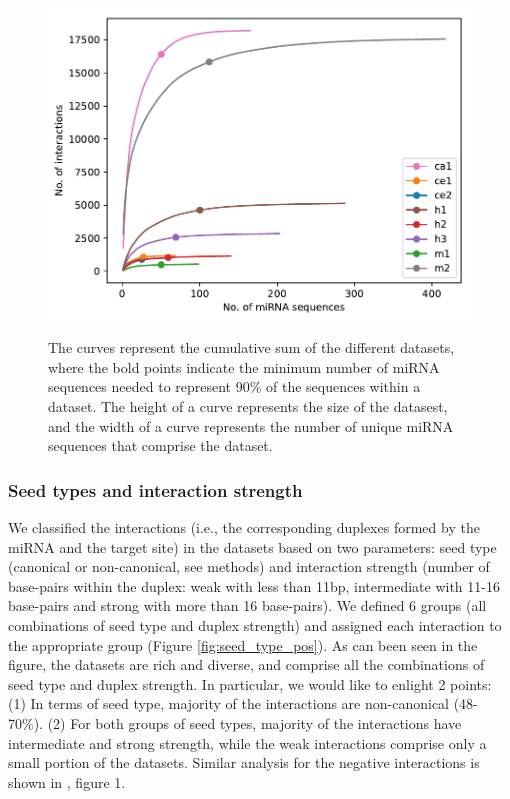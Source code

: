 \documentclass{bmcart}
\begin{document}
\begin{figure}[h!]
  \caption{ The curves represent the cumulative sum of the different datasets, where the bold points indicate the minimum number of miRNA sequences needed to represent 90\% of the sequences within a dataset. The height of a curve represents the size of the datasest, and the width of a curve represents the number of unique miRNA sequences that comprise the dataset.}
      \includegraphics[width = 1\textwidth]{Results/mirna_dist.pdf}
      \label{fig:datasetplot}
      \end{figure}


\subsubsection*{Seed types and interaction strength}
We classified the interactions (i.e., the corresponding duplexes formed by the miRNA and the target site) in the datasets based on two parameters: seed type (canonical or non-canonical, see methods) and interaction strength (number of base-pairs within the duplex: weak with less than 11bp, intermediate with 11-16 base-pairs and strong with more than 16 base-pairs). We defined 6 groups (all combinations of seed type and duplex strength) and assigned each interaction to the appropriate group (Figure \ref{fig:seed_type_pos}). As can been seen in the figure, the datasets are rich and diverse, and comprise all the combinations of seed type and duplex strength. In particular, we would like to enlight 2 points: (1) In terms of seed type, majority of the interactions are non-canonical (48-70\%). (2) For both groups of seed types,  majority of the interactions have intermediate and strong strength, while the weak interactions comprise only a small portion of the datasets. 
Similar analysis for the negative interactions is shown in , figure 1.
\end{document}
